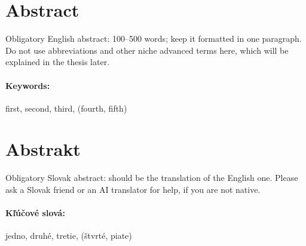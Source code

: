 
\section*{Abstract}

\begin{singlepar}
    Obligatory English abstract: 100--500 words; keep it formatted in one paragraph.
    Do not use abbreviations and other niche advanced terms here, which
    will be explained in the thesis later.
\end{singlepar}

\paragraph*{Keywords:} first, second, third, (fourth, fifth)

\newpage
\section*{Abstrakt}

\begin{singlepar}
    Obligatory Slovak abstract: should be the translation of the English one.
    Please ask a Slovak friend or an AI translator for help, if you are not native.
\end{singlepar}

\paragraph*{Kľúčové slová:} jedno, druhé, tretie, (štvrté, piate)
